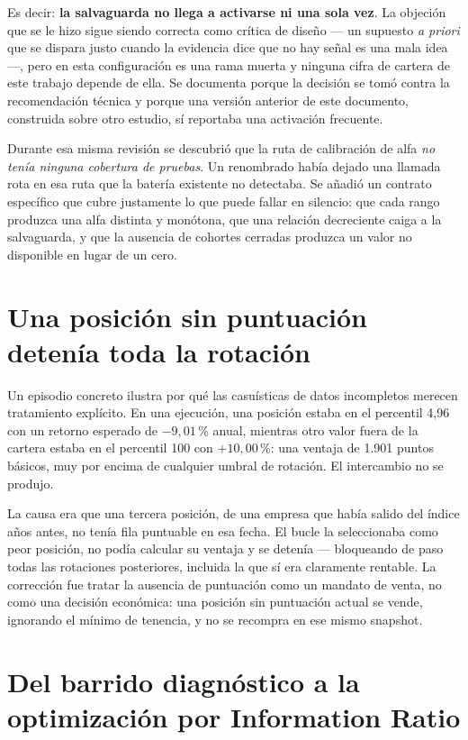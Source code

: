 Es decir: \textbf{la salvaguarda no llega a activarse ni una sola vez}. La objeción que se le hizo
sigue siendo correcta como crítica de diseño --- un supuesto \emph{a priori} que se dispara justo
cuando la evidencia dice que no hay señal es una mala idea ---, pero en esta configuración es una
rama muerta y ninguna cifra de cartera de este trabajo depende de ella. Se documenta porque la
decisión se tomó contra la recomendación técnica y porque una versión anterior de este documento,
construida sobre otro estudio, sí reportaba una activación frecuente.

Durante esa misma revisión se descubrió que la ruta de calibración de alfa \emph{no tenía ninguna
cobertura de pruebas}. Un renombrado había dejado una llamada rota en esa ruta que la batería
existente no detectaba. Se añadió un contrato específico que cubre justamente lo que puede fallar en
silencio: que cada rango produzca una alfa distinta y monótona, que una relación decreciente caiga a
la salvaguarda, y que la ausencia de cohortes cerradas produzca un valor no disponible en lugar de
un cero.

\section{Una posición sin puntuación detenía toda la rotación}

Un episodio concreto ilustra por qué las casuísticas de datos incompletos merecen tratamiento
explícito. En una ejecución, una posición estaba en el percentil 4,96 con un retorno esperado
de $-9{,}01$\,\% anual, mientras otro valor fuera de la cartera estaba en el percentil 100 con
$+10{,}00$\,\%: una ventaja de 1.901 puntos básicos, muy por encima de cualquier umbral de rotación.
El intercambio no se produjo.

La causa era que una tercera posición, de una empresa que había salido del índice años antes, no
tenía fila puntuable en esa fecha. El bucle la seleccionaba como peor posición, no podía calcular su
ventaja y se detenía --- bloqueando de paso todas las rotaciones posteriores, incluida la que sí era
claramente rentable. La corrección fue tratar la ausencia de puntuación como un mandato de venta,
no como una decisión económica: una posición sin puntuación actual se vende, ignorando el mínimo de
tenencia, y no se recompra en ese mismo snapshot.

\section{Del barrido diagnóstico a la optimización por Information Ratio}
\label{sec:portfolio-study}

